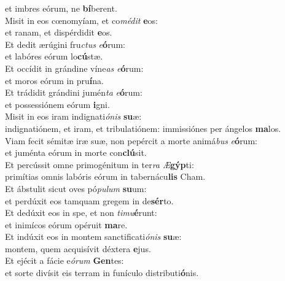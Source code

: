\oddverse et imbres eórum, ne \textbf{bí}berent.\\
\evenverse Misit in eos cœnomyíam, et co\textit{mé}\textit{dit} \textbf{e}os:~\*\\
\evenverse et ranam, et dispérdidit \textbf{e}os.\\
\oddverse Et dedit ærúgini fru\textit{ctus} \textit{e}\textbf{ó}rum:~\*\\
\oddverse et labóres eórum lo\textbf{cú}stæ.\\
\evenverse Et occídit in grándine víne\textit{as} \textit{e}\textbf{ó}rum:~\*\\
\evenverse et moros eórum in pru\textbf{í}na.\\
\oddverse Et trádidit grándini jumén\textit{ta} \textit{e}\textbf{ó}rum:~\*\\
\oddverse et possessiónem eórum \textbf{i}gni.\\
\evenverse Misit in eos iram indignati\textit{ó}\textit{nis} \textbf{su}æ:~\*\\
\evenverse indignatiónem, et iram, et tribulatiónem: immissiónes per ángelos \textbf{ma}los.\\
\oddverse Viam fecit sémitæ iræ suæ, non pepércit a morte animá\textit{bus} \textit{e}\textbf{ó}rum:~\*\\
\oddverse et juménta eórum in morte con\textbf{clú}sit.\\
\evenverse Et percússit omne primogénitum in ter\textit{ra} \textit{Æ}\textbf{gýp}ti:~\*\\
\evenverse primítias omnis labóris eórum in tabernácu\textbf{lis} Cham.\\
\oddverse Et ábstulit sicut oves pó\textit{pu}\textit{lum} \textbf{su}um:~\*\\
\oddverse et perdúxit eos tamquam gregem in de\textbf{sér}to.\\
\evenverse Et dedúxit eos in spe, et non \textit{ti}\textit{mu}\textbf{é}runt:~\*\\
\evenverse et inimícos eórum opéruit \textbf{ma}re.\\
\oddverse Et indúxit eos in montem sanctificati\textit{ó}\textit{nis} \textbf{su}æ:~\*\\
\oddverse montem, quem acquisívit déxtera \textbf{e}jus.\\
\evenverse Et ejécit a fácie e\textit{ó}\textit{rum} \textbf{Gen}tes:~\*\\
\evenverse et sorte divísit eis terram in funículo distributi\textbf{ó}nis.\\
